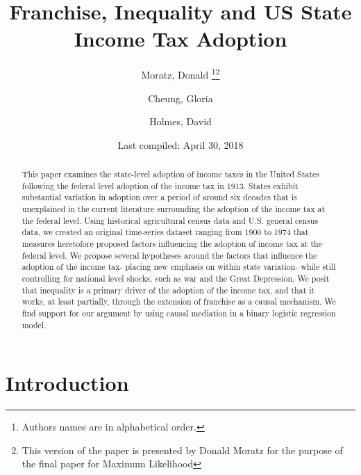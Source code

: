 \documentclass[letter, 12pt]{article}
\title{Franchise, Inequality and US State Income Tax Adoption}
\author{Moratz, Donald \thanks{Authors names are in alphabetical order.}\thanks{This version of the paper is presented by Donald Moratz for the purpose of the final paper for Maximum Likelihood} \and Cheung, Gloria \and Holmes, David}
\date{Last compiled: April 30, 2018}
\begin{document}
 

\thispagestyle{plain}
\maketitle	

\begin{abstract}
	This paper examines the state-level adoption of income taxes in the United States following the federal level adoption of the income tax in 1913. States exhibit substantial variation in adoption over a period of around six decades that is unexplained in the current literature surrounding the adoption of the income tax at the federal level. Using historical agricultural census data and U.S. general census data, we created an original time-series dataset ranging from 1900 to 1974 that measures heretofore proposed factors influencing the adoption of income tax at the federal level. We propose several hypotheses around the factors that influence the adoption of the income tax- placing new emphasis on within state variation- while still controlling for national level shocks, such as war and the Great Depression. We posit that inequality is a primary driver of the adoption of the income tax, and that it works, at least partially, through the extension of franchise as a causal mechanism. We find support for our argument by using causal mediation in a binary logistic regression model. 
\end{abstract}

\pagebreak


\doublespacing


\section{Introduction}
\end{document}
